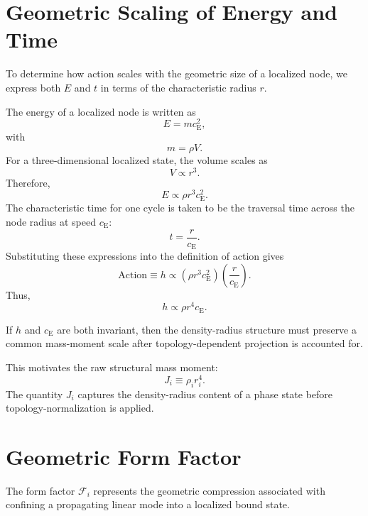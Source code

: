 \section{Geometric Scaling of Energy and Time}
To determine how action scales with the geometric size of a localized node, we express both $E$ and $t$ in terms of the characteristic radius $r$.

The energy of a localized node is written as
\begin{equation}
    E = m c_{\mathrm{E}}^2,
\end{equation}
with
\begin{equation}
    m = \rho V.
\end{equation}
For a three-dimensional localized state, the volume scales as
\begin{equation}
    V \propto r^3.
\end{equation}
Therefore,
\begin{equation}
    E \propto \rho r^3 c_{\mathrm{E}}^2.
\end{equation}
The characteristic time for one cycle is taken to be the traversal time across the node radius at speed $c_{\mathrm{E}}$:
\begin{equation}
    t = \frac{r}{c_{\mathrm{E}}}.
\end{equation}
Substituting these expressions into the definition of action gives
\begin{equation}
    \text{Action} \equiv h \propto \left(\rho r^3 c_{\mathrm{E}}^2\right) \left(\frac{r}{c_{\mathrm{E}}}\right).
\end{equation}
Thus,
\begin{equation}
    h \propto \rho r^4 c_{\mathrm{E}}.
\end{equation}

If $h$ and $c_{\mathrm{E}}$ are both invariant, then the density-radius structure must preserve a common mass-moment scale after topology-dependent projection is accounted for.

This motivates the raw structural mass moment:
\begin{equation}
    J_i \equiv \rho_i r_i^4.
\end{equation}
The quantity $J_i$ captures the density-radius content of a phase state before topology-normalization is applied.

\section{Geometric Form Factor}
The form factor $\mathcal{F}_i$ represents the geometric compression associated with confining a propagating linear mode into a localized bound state.

